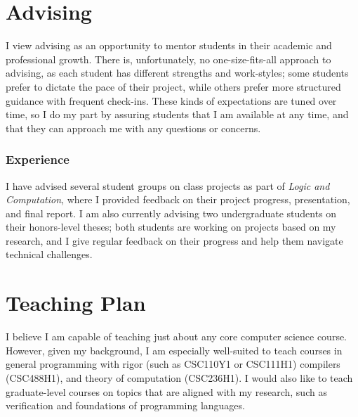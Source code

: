 \documentclass[11pt]{article}
\begin{document}
\section*{Advising}
I view advising as an opportunity to mentor students in their academic and professional growth.
There is, unfortunately, no one-size-fits-all approach to advising, as each student has different strengths and work-styles;
some students prefer to dictate the pace of their project, while others prefer more structured guidance with frequent check-ins.
These kinds of expectations are tuned over time, so I do my part by assuring students that I am available at any time, and that they can approach me with any questions or concerns.


\subsubsection*{Experience}
I have advised several student groups on class projects as part of \emph{Logic and Computation}, where I provided feedback on their project progress, presentation, and final report.
I am also currently advising two undergraduate students on their honors-level theses; both students are working on projects based on my research, and I give regular feedback on their progress and help them navigate technical challenges.


\section*{Teaching Plan}
I believe I am capable of teaching just about any core computer science course.
However, given my background, I am especially well-suited to teach courses in general programming with rigor (such as CSC110Y1 or CSC111H1) compilers (CSC488H1), and theory of computation (CSC236H1).
I would also like to teach graduate-level courses on topics that are aligned with my research, such as verification and foundations of programming languages.

\end{document}
